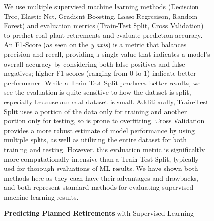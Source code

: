 \begin{figure}[h!]
    \centering
      
    \caption{\textbf{Predicting Planned Retirements} with Supervised Learning}
    \medskip
    \footnotesize

    \smallskip  %
    
    We use multiple supervised machine learning methods (Deciscion Tree, Elastic Net, Gradient Boosting, Lasso Regresison, Random Forest) and evaluation metrics (Train-Test Split, Cross Validation) to predict coal plant retirements and evaluate prediction accuracy.
    An F1-Score (as seen on the \textit{y axis}) is a metric that balances precision and recall, providing a single value that indicates a model's overall accuracy by considering both false positives and false negatives; higher F1 scores (ranging from 0 to 1) indicate better performance.
    While a Train-Test Split produces  better results, we see the evaluation is quite sensitive to how the dataset is split, especially because our coal dataset is small. Additionally, Train-Test Split uses a portion of the data only for training and another portion only for testing, so is prone to overfitting.
    Cross Validation provides a more robust estimate of model performance by using multiple splits, as well as utilizing the entire dataset for both training and testing. However, this evaluation metric is significaltly more computationally intensive than a Train-Test Split, typically ued for thorough evaluations of ML results. We have shown both methods here as they each have their advantages and drawbacks, and both represent standard methods for evaluating supervised machine learning results.
    \label{fig:ML-Predictions}
\end{figure}

